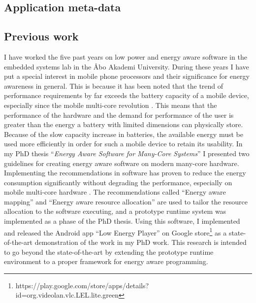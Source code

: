 \documentclass{article}
\begin{document}
\subsection{Application meta-data}

\subsection{Previous work}
I have worked the five past years on low power and energy aware software in the embedded systems lab in the \AA{}bo Akademi University. 
During these years I have put a special interest in mobile phone processors and their significance for energy awareness in general. 
This is because it has been noted that the trend of performance requirements by far exceeds the battery capacity of a mobile device, especially since the mobile multi-core revolution \cite{BatteryCapacity,CPUCapacity}. 
This means that the performance of the hardware and the demand for performance of the user is greater than the energy a battery with limited dimensions can physically store. 
Because of the slow capacity increase in batteries, the available energy must be used more efficiently in order for such a mobile device to retain its usability.
In my PhD thesis ``\textit{Energy Aware Software for Many-Core Systems}'' I presented two guidelines for creating energy aware software on modern many-core hardware. 
Implementing the recommendations in software has proven to reduce the energy consumption significantly without degrading the performance, especially on mobile multi-core hardware \cite{HolmbackaHipeac}. 
The recommendations called ``Energy aware mapping'' and ``Energy aware resource allocation'' are used to tailor the resource allocation to the software executing, 
and a prototype runtime system was implemented as a phase of the PhD thesis. 
Using this software, I implemented and released the Android app “Low Energy Player” on Google store\footnote{https://play.google.com/store/apps/details?id=org.videolan.vlc.LEL.lite.green} as a state-of-the-art demonstration of the work in my PhD work. 
This research is intended to go beyond the state-of-the-art by extending the prototype runtime environment to a proper framework for energy aware programming.
\end{document}
